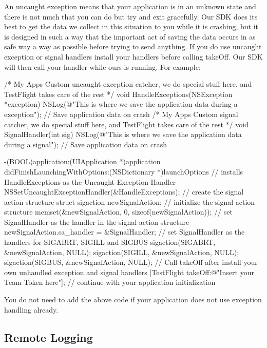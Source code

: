 An uncaught exception means that your application is in an unknown state and there is not much that you can do but try and exit gracefully. Our S\-D\-K does its best to get the data we collect in this situation to you while it is crashing, but it is designed in such a way that the important act of saving the data occurs in as safe way a way as possible before trying to send anything. If you do use uncaught exception or signal handlers install your handlers before calling {\ttfamily take\-Off}. Our S\-D\-K will then call your handler while ours is running. For example\-: \begin{DoxyVerb}  /*
   My Apps Custom uncaught exception catcher, we do special stuff here, and TestFlight takes care of the rest
  */
  void HandleExceptions(NSException *exception) {
    NSLog(@"This is where we save the application data during a exception");
    // Save application data on crash
  }
  /*
   My Apps Custom signal catcher, we do special stuff here, and TestFlight takes care of the rest
  */
  void SignalHandler(int sig) {
    NSLog(@"This is where we save the application data during a signal");
    // Save application data on crash
  }

  -(BOOL)application:(UIApplication *)application 
  didFinishLaunchingWithOptions:(NSDictionary *)launchOptions {    
    // installs HandleExceptions as the Uncaught Exception Handler
    NSSetUncaughtExceptionHandler(&HandleExceptions);
    // create the signal action structure 
    struct sigaction newSignalAction;
    // initialize the signal action structure
    memset(&newSignalAction, 0, sizeof(newSignalAction));
    // set SignalHandler as the handler in the signal action structure
    newSignalAction.sa_handler = &SignalHandler;
    // set SignalHandler as the handlers for SIGABRT, SIGILL and SIGBUS
    sigaction(SIGABRT, &newSignalAction, NULL);
    sigaction(SIGILL, &newSignalAction, NULL);
    sigaction(SIGBUS, &newSignalAction, NULL);
    // Call takeOff after install your own unhandled exception and signal handlers
    [TestFlight takeOff:@"Insert your Team Token here"];
    // continue with your application initialization
  }
\end{DoxyVerb}


You do not need to add the above code if your application does not use exception handling already.

\subsection*{Remote Logging}

